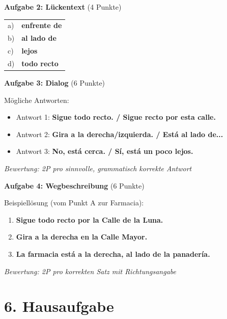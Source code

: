 \documentclass[11pt, a4paper]{article}
\newcommand{\loesung}[1]{\textcolor{loesung}{\textbf{#1}}}
\begin{document}
\vspace{1em}

\textbf{Aufgabe 2: Lückentext} (4 Punkte)

\begin{tabular}{ll}
a) & \loesung{enfrente de} \\
b) & \loesung{al lado de} \\
c) & \loesung{lejos} \\
d) & \loesung{todo recto} \\
\end{tabular}

\vspace{1em}

\textbf{Aufgabe 3: Dialog} (6 Punkte)

Mögliche Antworten:
\begin{itemize}
    \item Antwort 1: \loesung{Sigue todo recto. / Sigue recto por esta calle.}
    \item Antwort 2: \loesung{Gira a la derecha/izquierda. / Está al lado de...}
    \item Antwort 3: \loesung{No, está cerca. / Sí, está un poco lejos.}
\end{itemize}

\textit{Bewertung: 2P pro sinnvolle, grammatisch korrekte Antwort}

\vspace{1em}

\textbf{Aufgabe 4: Wegbeschreibung} (6 Punkte)

Beispiellösung (vom Punkt A zur Farmacia):
\begin{enumerate}
    \item \loesung{Sigue todo recto por la Calle de la Luna.}
    \item \loesung{Gira a la derecha en la Calle Mayor.}
    \item \loesung{La farmacia está a la derecha, al lado de la panadería.}
\end{enumerate}

\textit{Bewertung: 2P pro korrekten Satz mit Richtungsangabe}


\section*{6. Hausaufgabe}
\end{document}
